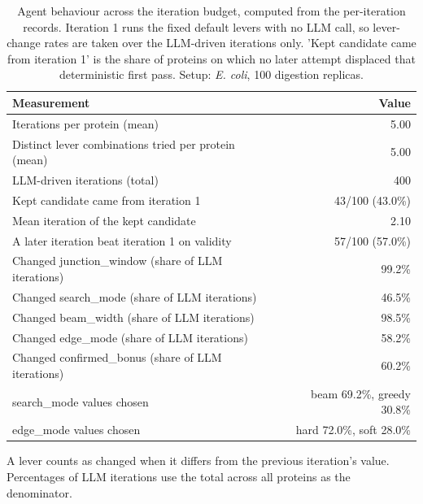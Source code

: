 \begin{table}[!tb]
  \centering
  \caption{Agent behaviour across the iteration budget, computed from the per-iteration records. Iteration 1 runs the fixed default levers with no LLM call, so lever-change rates are taken over the LLM-driven iterations only. 'Kept candidate came from iteration 1' is the share of proteins on which no later attempt displaced that deterministic first pass. Setup: \textnormal{\textnormal{\textit{E. coli}}}, 100 digestion replicas.}
  \label{tab:agent_behaviour_ecoli_r100}
  \begin{tabular}{lr}
    \toprule
    Measurement & Value \\
    \midrule
    Iterations per protein (mean) & 5.00 \\
    Distinct lever combinations tried per protein (mean) & 5.00 \\
    LLM-driven iterations (total) & 400 \\
    Kept candidate came from iteration 1 & 43/100 (43.0\%) \\
    Mean iteration of the kept candidate & 2.10 \\
    A later iteration beat iteration 1 on validity & 57/100 (57.0\%) \\
    Changed junction\_window (share of LLM iterations) & 99.2\% \\
    Changed search\_mode (share of LLM iterations) & 46.5\% \\
    Changed beam\_width (share of LLM iterations) & 98.5\% \\
    Changed edge\_mode (share of LLM iterations) & 58.2\% \\
    Changed confirmed\_bonus (share of LLM iterations) & 60.2\% \\
    search\_mode values chosen & beam 69.2\%, greedy 30.8\% \\
    edge\_mode values chosen & hard 72.0\%, soft 28.0\% \\
    \bottomrule
  \end{tabular}
  \par\smallskip\footnotesize{A lever counts as changed when it differs from the previous iteration's value. Percentages of LLM iterations use the total across all proteins as the denominator.}
\end{table}
